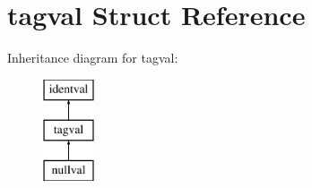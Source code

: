 \hypertarget{structtagval}{}\section{tagval Struct Reference}
\label{structtagval}
Inheritance diagram for tagval\+:\begin{figure}[H]
\begin{center}
\leavevmode
\includegraphics[height=3.000000cm]{structtagval}
\end{center}
\end{figure}
